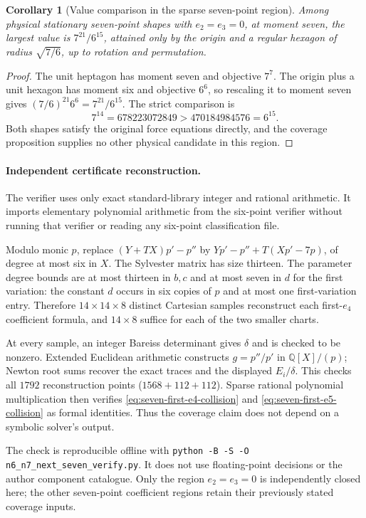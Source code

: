 \documentclass[11pt]{article}
\newtheorem{corollary}[theorem]{Corollary}
\theoremstyle{remark}
\numberwithin{equation}{section}
\begin{document}
\begin{corollary}[Value comparison in the sparse seven-point region]
\label{cor:seven-sparse-value}
Among physical stationary seven-point shapes with $e_2=e_3=0$, at
moment seven, the largest value is $7^{21}/6^{15}$, attained only by
the origin and a regular hexagon of radius $\sqrt{7/6}$, up to rotation
and permutation.
\end{corollary}
\begin{proof}
The unit heptagon has moment seven and objective $7^7$.
The origin plus a unit hexagon has moment six and objective $6^6$,
so rescaling it to moment seven gives
$(7/6)^{21}6^6=7^{21}/6^{15}$. The strict comparison is
\[
 7^{14}=678223072849>470184984576=6^{15}.
\]
Both shapes satisfy the original force equations directly, and the
coverage proposition supplies no other physical candidate in this region.
\end{proof}

\paragraph{Independent certificate reconstruction.}
The verifier  uses only exact
standard-library integer and rational arithmetic. It imports elementary
polynomial arithmetic from the six-point verifier without running that
verifier or reading any six-point classification file.

Modulo monic $p$, replace $(Y+TX)p'-p''$ by
$Yp'-p''+T(Xp'-7p)$, of degree at most six in $X$.
The Sylvester matrix has size thirteen. The parameter degree bounds
are at most thirteen in $b,c$ and at most seven in $d$ for the first
variation: the constant $d$ occurs in six copies of $p$ and at most
one first-variation entry. Therefore $14\times14\times8$ distinct
Cartesian samples reconstruct each first-$e_4$ coefficient formula,
and $14\times8$ suffice for each of the two smaller charts.

At every sample, an integer Bareiss determinant gives $\delta$ and
is checked to be nonzero. Extended Euclidean arithmetic constructs
$g=p''/p'$ in $\mathbb Q[X]/(p)$; Newton root sums recover the exact
traces and the displayed $E_i/\delta$. This checks all $1792$
reconstruction points ($1568+112+112$). Sparse rational polynomial
multiplication then verifies
\eqref{eq:seven-first-e4-collision} and
\eqref{eq:seven-first-e5-collision} as formal identities. Thus the
coverage claim does not depend on a symbolic solver's output.

The check is reproducible offline with
\texttt{python -B -S -O n6\_n7\_next\_seven\_verify.py}. It does not
use floating-point decisions or the author component catalogue.
Only the region $e_2=e_3=0$ is independently closed here; the other
seven-point coefficient regions retain their previously stated coverage
inputs.
\end{document}
